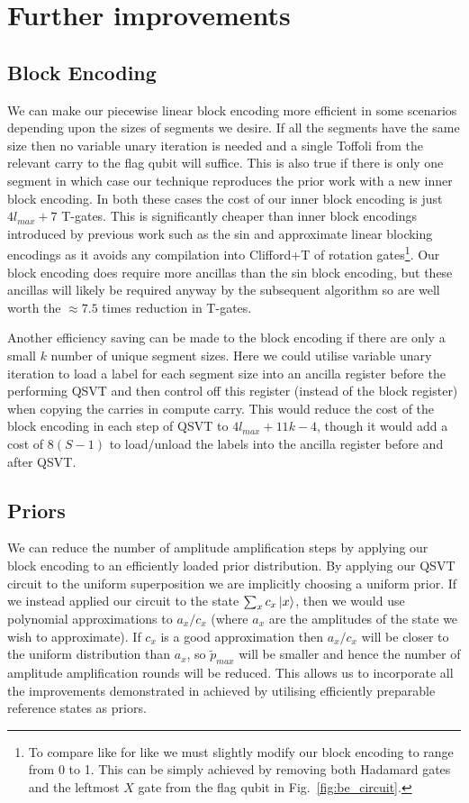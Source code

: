 \documentclass[aps,prx,twocolumn,floatfix,10pt,amssymb,amsfont,amsmath,superscriptaddress,float,nofootinbib,longbibliography,nobalancelastpage]{revtex4-2}
\theoremstyle{empty}
\begin{document}
\section{Further improvements}
\subsection{Block Encoding}
\label{section:improve-be}We can make our piecewise linear block encoding more efficient in some scenarios depending upon the sizes of segments we desire. If all the segments have the same size then no variable unary iteration is needed and a single Toffoli from the relevant carry to the flag qubit will suffice. This is also true if there is only one segment in which case our technique reproduces the prior work \cite{mcardleQuantumStatePreparation2022} with a new inner block encoding. In both these cases the cost of our inner block encoding is just $4l_{max} + 7$ T-gates. This is significantly cheaper than inner block encodings introduced by previous work such as the sin \cite{mcardleQuantumStatePreparation2022} and approximate linear \cite{Gonzalez-Conde:2023fjg} blocking encodings as it avoids any compilation into Clifford+T of rotation gates\footnote{To compare like for like we must slightly modify our block encoding to range from 0 to 1. This can be simply achieved by removing both Hadamard gates and the leftmost $X$ gate from the flag qubit in Fig.~\ref{fig:be_circuit}.}. Our block encoding does require more ancillas than the sin block encoding, but these ancillas will likely be required anyway by the subsequent algorithm so are well worth the $\approx 7.5$ times reduction in T-gates.


Another efficiency saving can be made to the block encoding if there are only a small $k$ number of unique segment sizes. Here we could utilise variable unary iteration to load a label for each segment size into an ancilla register before the performing QSVT and then control off this register (instead of the block register) when copying the carries in compute carry. This would reduce the cost of the block encoding in each step of QSVT to $4l_{max} + 11 k - 4$, though it would add a cost of $8(S-1)$ to load/unload the labels into the ancilla register before and after QSVT.

\subsection{Priors} We can reduce the number of amplitude amplification steps by applying our block encoding to an efficiently loaded prior distribution. By applying our QSVT circuit to the uniform superposition we are implicitly choosing a uniform prior. If we instead applied our circuit to the state $\sum_x c_x \ket{x}$, then we would use polynomial approximations to $a_x/c_x$ (where $a_x$ are the amplitudes of the state we wish to approximate). If $c_x$ is a good approximation then $a_x/c_x$ will be closer to the uniform distribution than $a_x$, so $\tilde{p}_{max}$ will be smaller and hence the number of amplitude amplification rounds will be reduced. This allows us to incorporate all the improvements demonstrated in \cite{Lemieux:2024pmt} achieved by utilising efficiently preparable reference states as priors.
\end{document}
